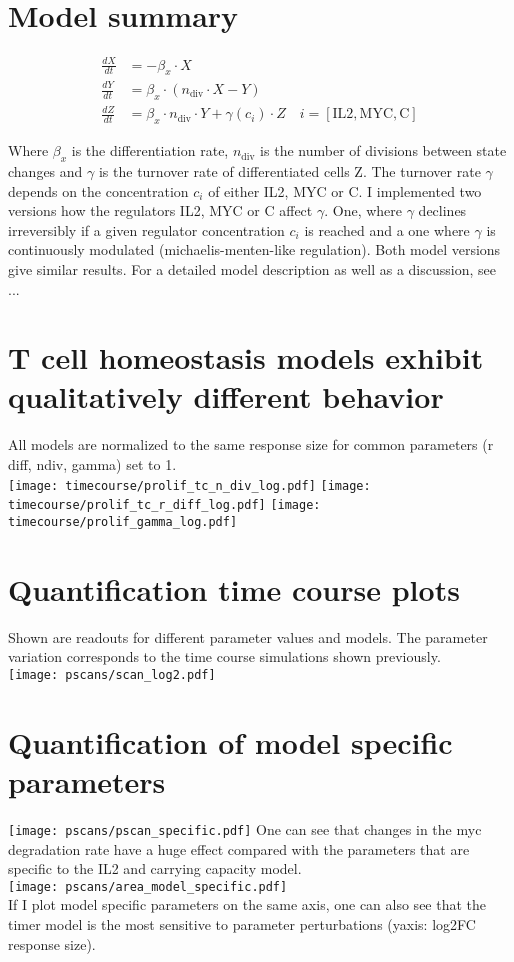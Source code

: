\documentclass[12pt,a4paper]{article}
\begin{document}
\section*{Model summary}
\begin{align*}
\frac{dX}{dt} &= -\beta_x \cdot X\\
\frac{dY}{dt} &= \beta_x \cdot (n_{\text{div}} \cdot X -  Y) \\
\frac{dZ}{dt} &= \beta_x \cdot n_{\text{div}} \cdot Y + \gamma(c_i) \cdot Z \quad i = [\text{IL2}, \text{MYC}, \text{C}]
\end{align*}

Where $\beta_x$ is the differentiation rate, $n_\text{div}$ is the number of divisions between state changes and $\gamma$ is the turnover rate of differentiated cells Z. The turnover rate $\gamma$ depends on the concentration $c_i$ of either IL2, MYC or C. I implemented two versions how the regulators IL2, MYC or C affect $\gamma$. One, where $\gamma$ declines irreversibly if a given regulator concentration $c_i$ is reached and a one where $\gamma$ is continuously modulated (michaelis-menten-like regulation). Both model versions give similar results. For a detailed model description as well as a discussion, see ...

\section*{T cell homeostasis models exhibit qualitatively different behavior}
All models are normalized to the same response size for common parameters (r diff, ndiv, gamma) set to 1. \\
\texttt{[image: timecourse/prolif\_tc\_n\_div\_log.pdf]}
\texttt{[image: timecourse/prolif\_tc\_r\_diff\_log.pdf]}
\texttt{[image: timecourse/prolif\_gamma\_log.pdf]}
\newpage

\section*{Quantification time course plots}
Shown are readouts for different parameter values and models. The parameter variation corresponds to the time course simulations shown previously.\\
\texttt{[image: pscans/scan\_log2.pdf]}

\section*{Quantification of model specific parameters}
\texttt{[image: pscans/pscan\_specific.pdf]}
One can see that changes in the myc degradation rate have a huge effect compared with the parameters that are specific to the IL2 and carrying capacity model.\\
\texttt{[image: pscans/area\_model\_specific.pdf]}\\
If I plot model specific parameters on the same axis, one can also see that the timer model is the most sensitive to parameter perturbations (yaxis: log2FC response size).
\end{document}
